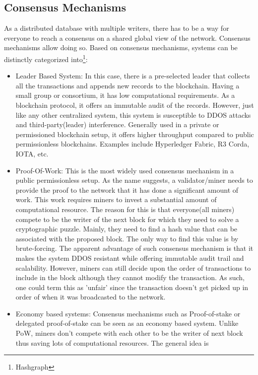 \subsection{Consensus Mechanisms}
As a distributed database with multiple writers, there has to be a way for
everyone to reach a consensus on a shared global view of the network. Consensus
mechanisms allow doing so. Based on consensus mechanisms, systems can be
distinctly categorized into\footnote{Hashgraph}:
\begin{itemize}
	\item Leader Based System: In this case, there is a pre-selected leader
		that collects all the transactions and appends new records to the
		blockchain.  Having a small group or consortium, it has low
		computational requirements. As a blockchain protocol, it offers an
		immutable audit of the records. However, just like any other
		centralized system, this system is susceptible to DDOS attacks and
		third-party(leader) interference. Generally used in a private or
		permissioned blockchain setup, it offers higher throughput compared to
		public permissionless blockchains. Examples include Hyperledger Fabric,
		R3 Corda, IOTA, etc. 
	\item Proof-Of-Work: This is the most widely used consensus mechanism in a
		public permissionless setup. As the name suggests, a validator/miner
		needs to provide the proof to the network that it has done a
		significant amount of work. This work requires miners to invest a
		substantial amount of computational resource. The reason for this is
		that everyone(all miners) compete to be the writer of the next block
		for which they need to solve a cryptographic puzzle. Mainly, they need
		to find a hash value that can be associated with the proposed block.
		The only way to find this value is by brute-forcing. The apparent
		advantage of such consensus mechanism is that it makes the system DDOS
		resistant while offering immutable audit trail and scalability.
		However, miners can still decide upon the order of transactions to
		include in the block although they cannot modify the transaction. As
		such, one could term this as 'unfair' since the transaction doesn't get
		picked up in order of when it was broadcasted to the network. 
	\item Economy based systems: Consensus mechanisms such as Proof-of-stake or
		delegated proof-of-stake can be seen as an economy based system. Unlike
		PoW, miners don't compete with each other to be the writer of next
		block thus saving lots of computational resources. The general idea is

\end{itemize}
